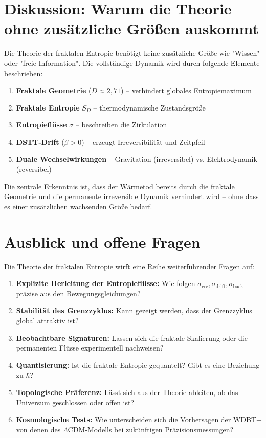 \documentclass[12pt,a4paper]{article}
\begin{document}
\section{Diskussion: Warum die Theorie ohne zusätzliche Größen auskommt}

Die Theorie der fraktalen Entropie benötigt keine zusätzliche Größe wie "Wissen" oder "freie Information". Die vollständige Dynamik wird durch folgende Elemente beschrieben:

\begin{enumerate}
    \item \textbf{Fraktale Geometrie} ($D \approx 2,71$) – verhindert globales Entropiemaximum
    \item \textbf{Fraktale Entropie} $S_D$ – thermodynamische Zustandsgröße
    \item \textbf{Entropieflüsse} $\sigma$ – beschreiben die Zirkulation
    \item \textbf{DSTT-Drift} ($\dot{\beta}>0$) – erzeugt Irreversibilität und Zeitpfeil
    \item \textbf{Duale Wechselwirkungen} – Gravitation (irreversibel) vs. Elektrodynamik (reversibel)
\end{enumerate}

Die zentrale Erkenntnis ist, dass der Wärmetod bereits durch die fraktale Geometrie und die permanente irreversible Dynamik verhindert wird – ohne dass es einer zusätzlichen wachsenden Größe bedarf.

\section{Ausblick und offene Fragen}

Die Theorie der fraktalen Entropie wirft eine Reihe weiterführender Fragen auf:

\begin{enumerate}
    \item \textbf{Explizite Herleitung der Entropieflüsse:} Wie folgen $\sigma_{\text{cre}}, \sigma_{\text{drift}}, \sigma_{\text{back}}$ präzise aus den Bewegungsgleichungen?
    
    \item \textbf{Stabilität des Grenzzyklus:} Kann gezeigt werden, dass der Grenzzyklus global attraktiv ist?
    
    \item \textbf{Beobachtbare Signaturen:} Lassen sich die fraktale Skalierung oder die permanenten Flüsse experimentell nachweisen?
    
    \item \textbf{Quantisierung:} Ist die fraktale Entropie gequantelt? Gibt es eine Beziehung zu $\hbar$?
    
    \item \textbf{Topologische Präferenz:} Lässt sich aus der Theorie ableiten, ob das Universum geschlossen oder offen ist?
    
    \item \textbf{Kosmologische Tests:} Wie unterscheiden sich die Vorhersagen der WDBT+ von denen des $\Lambda$CDM-Modells bei zukünftigen Präzisionsmessungen?
\end{enumerate}
\end{document}
